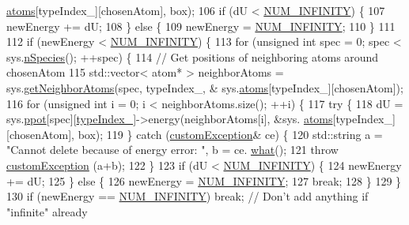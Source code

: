 \begin{DoxyCode}
      \hyperlink{classsim_system_a90421b19082f7fb8fc23b7264b1161e4}{atoms}[typeIndex\_][chosenAtom], box);
106     \textcolor{keywordflow}{if} (dU < \hyperlink{potentials_8h_ab94ab1d09e2291d03fe92a0e24a9d33b}{NUM\_INFINITY}) \{
107         newEnergy += dU;
108     \} \textcolor{keywordflow}{else} \{
109         newEnergy = \hyperlink{potentials_8h_ab94ab1d09e2291d03fe92a0e24a9d33b}{NUM\_INFINITY};
110     \}
111 
112     \textcolor{keywordflow}{if} (newEnergy < \hyperlink{potentials_8h_ab94ab1d09e2291d03fe92a0e24a9d33b}{NUM\_INFINITY}) \{
113         \textcolor{keywordflow}{for} (\textcolor{keywordtype}{unsigned} \textcolor{keywordtype}{int} spec = 0; spec < sys.\hyperlink{classsim_system_ab5e2e9b6204de15520302fe1d51688dd}{nSpecies}(); ++spec) \{
114             \textcolor{comment}{// Get positions of neighboring atoms around chosenAtom}
115             std::vector< atom* > neighborAtoms = sys.\hyperlink{classsim_system_a9b3aeefa22c3b50b5913df6eea753bc6}{getNeighborAtoms}(spec, typeIndex\_, &
      sys.\hyperlink{classsim_system_a90421b19082f7fb8fc23b7264b1161e4}{atoms}[typeIndex\_][chosenAtom]);
116             \textcolor{keywordflow}{for} (\textcolor{keywordtype}{unsigned} \textcolor{keywordtype}{int} i = 0; i < neighborAtoms.size(); ++i) \{
117                 \textcolor{keywordflow}{try} \{
118                     dU = sys.\hyperlink{classsim_system_ad2e290b5963f132e6a3a56cee35c8e9f}{ppot}[spec][\hyperlink{classmc_move_acb731965547b0326ef318ec96da8b46a}{typeIndex\_}]->energy(neighborAtoms[i], &sys.
      \hyperlink{classsim_system_a90421b19082f7fb8fc23b7264b1161e4}{atoms}[typeIndex\_][chosenAtom], box);
119                 \} \textcolor{keywordflow}{catch} (\hyperlink{classcustom_exception}{customException}& ce) \{
120                     std::string a = \textcolor{stringliteral}{"Cannot delete because of energy error: "}, b = ce.
      \hyperlink{classcustom_exception_aeb6ab5848b038adfc68fde86a512f691}{what}();
121                     \textcolor{keywordflow}{throw} \hyperlink{classcustom_exception}{customException} (a+b);
122                 \}
123                 \textcolor{keywordflow}{if} (dU < \hyperlink{potentials_8h_ab94ab1d09e2291d03fe92a0e24a9d33b}{NUM\_INFINITY}) \{
124                     newEnergy += dU;
125                 \} \textcolor{keywordflow}{else} \{
126                     newEnergy = \hyperlink{potentials_8h_ab94ab1d09e2291d03fe92a0e24a9d33b}{NUM\_INFINITY};
127                     \textcolor{keywordflow}{break};
128                 \}
129             \}
130             \textcolor{keywordflow}{if} (newEnergy == \hyperlink{potentials_8h_ab94ab1d09e2291d03fe92a0e24a9d33b}{NUM\_INFINITY}) \textcolor{keywordflow}{break}; \textcolor{comment}{// Don't add anything if "infinite" already}

\end{DoxyCode}
